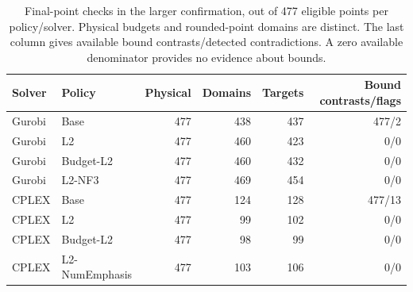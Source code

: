 \begin{table}[htbp]
\centering\small\setlength{\tabcolsep}{3pt}
\caption{Final-point checks in the larger confirmation, out of 477 eligible
points per policy/solver. Physical budgets and rounded-point domains are
distinct. The last column gives available bound contrasts/detected
contradictions. A zero available denominator provides no evidence about bounds.}
\label{tab:orf-large-precision}
\begin{tabular}{llrrrr}\toprule
Solver & Policy & Physical & Domains & Targets & Bound contrasts/flags\\\midrule
Gurobi & Base & 477 & 438 & 437 & 477/2\\
Gurobi & L2 & 477 & 460 & 423 & 0/0\\
Gurobi & Budget-L2 & 477 & 460 & 432 & 0/0\\
Gurobi & L2-NF3 & 477 & 469 & 454 & 0/0\\
CPLEX & Base & 477 & 124 & 128 & 477/13\\
CPLEX & L2 & 477 & 99 & 102 & 0/0\\
CPLEX & Budget-L2 & 477 & 98 & 99 & 0/0\\
CPLEX & L2-NumEmphasis & 477 & 103 & 106 & 0/0\\
\bottomrule\end{tabular}\end{table}
